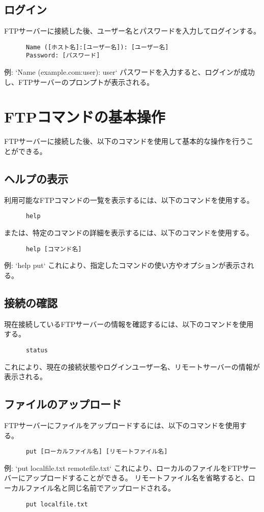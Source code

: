 \documentclass[a4paper,10pt]{jsarticle}
\begin{document}
    \subsection{ログイン}
    FTPサーバーに接続した後、ユーザー名とパスワードを入力してログインする。
    \begin{lstlisting}
      Name ([ホスト名]:[ユーザー名]): [ユーザー名]
      Password: [パスワード]
    \end{lstlisting}
    例: `Name (example.com:user): user`
    パスワードを入力すると、ログインが成功し、FTPサーバーのプロンプトが表示される。
\section{FTPコマンドの基本操作}
    FTPサーバーに接続した後、以下のコマンドを使用して基本的な操作を行うことができる。

    \subsection{ヘルプの表示}
    利用可能なFTPコマンドの一覧を表示するには、以下のコマンドを使用する。
    \begin{lstlisting}
      help
    \end{lstlisting}
    または、特定のコマンドの詳細を表示するには、以下のコマンドを使用する。
    \begin{lstlisting}
      help [コマンド名]
    \end{lstlisting}
    例: `help put`
    これにより、指定したコマンドの使い方やオプションが表示される。

    \subsection{接続の確認}
    現在接続しているFTPサーバーの情報を確認するには、以下のコマンドを使用する。
    \begin{lstlisting}
      status
    \end{lstlisting}
    これにより、現在の接続状態やログインユーザー名、リモートサーバーの情報が表示される。

    \subsection{ファイルのアップロード}
    FTPサーバーにファイルをアップロードするには、以下のコマンドを使用する。
    \begin{lstlisting}
      put [ローカルファイル名] [リモートファイル名]
    \end{lstlisting}
    例: `put localfile.txt remotefile.txt`
    これにより、ローカルのファイルをFTPサーバーにアップロードすることができる。
    リモートファイル名を省略すると、ローカルファイル名と同じ名前でアップロードされる。
    \begin{lstlisting}
      put localfile.txt
    \end{lstlisting}
\end{document}
